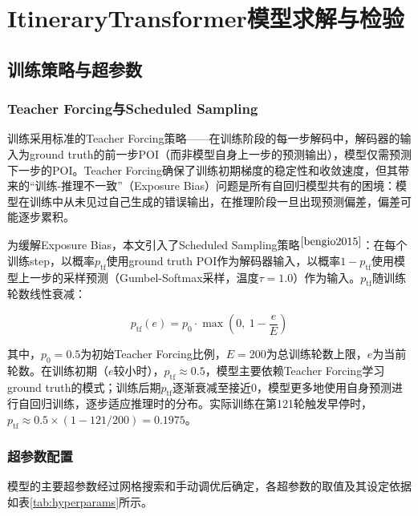 \documentclass[12pt,a4paper]{ctexart}
\begin{document}
\section{ItineraryTransformer模型求解与检验}

\subsection{训练策略与超参数}

\subsubsection{Teacher Forcing与Scheduled Sampling}

训练采用标准的Teacher Forcing策略——在训练阶段的每一步解码中，解码器的输入为ground truth的前一步POI（而非模型自身上一步的预测输出），模型仅需预测下一步的POI。Teacher Forcing确保了训练初期梯度的稳定性和收敛速度，但其带来的“训练-推理不一致”（Exposure Bias）问题是所有自回归模型共有的困境：模型在训练中从未见过自己生成的错误输出，在推理阶段一旦出现预测偏差，偏差可能逐步累积。

为缓解Exposure Bias，本文引入了Scheduled Sampling策略$^{\cite{bengio2015}}$：在每个训练step，以概率$p_{\text{tf}}$使用ground truth POI作为解码器输入，以概率$1-p_{\text{tf}}$使用模型上一步的采样预测（Gumbel-Softmax采样，温度$\tau=1.0$）作为输入。$p_{\text{tf}}$随训练轮数线性衰减：

\begin{equation}
p_{\text{tf}}(e) = p_0\cdot\max\!\left(0,\ 1-\frac{e}{E}\right)
\label{eq:scheduled}
\end{equation}

其中，$p_0=0.5$为初始Teacher Forcing比例，$E=200$为总训练轮数上限，$e$为当前轮数。在训练初期（$e$较小时），$p_{\text{tf}}\approx 0.5$，模型主要依赖Teacher Forcing学习ground truth的模式；训练后期$p_{\text{tf}}$逐渐衰减至接近0，模型更多地使用自身预测进行自回归训练，逐步适应推理时的分布。实际训练在第121轮触发早停时，$p_{\text{tf}}\approx 0.5\times(1-121/200)=0.1975$。

\subsubsection{超参数配置}

模型的主要超参数经过网格搜索和手动调优后确定，各超参数的取值及其设定依据如表\ref{tab:hyperparams}所示。
\end{document}
